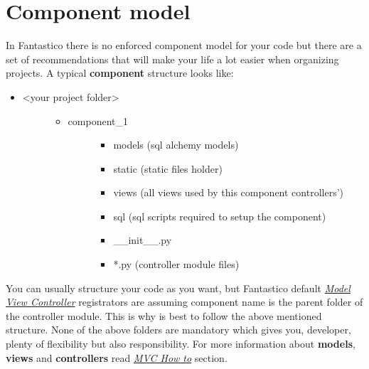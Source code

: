 \documentclass[letterpaper,10pt,english]{sphinxmanual}
\begin{document}
\section{Component model}
\label{features/component_model::doc}\label{features/component_model:component-model}
In Fantastico there is no enforced component model for your code but there are a set of recommendations
that will make your life a lot easier when organizing projects. A typical \textbf{component} structure looks like:
\begin{itemize}
\item {} \begin{description}
\item[{\textless{}your project folder\textgreater{}}] \leavevmode\begin{itemize}
\item {} \begin{description}
\item[{component\_1}] \leavevmode\begin{itemize}
\item {} 
models (sql alchemy models)

\item {} 
static (static files holder)

\item {} 
views (all views used by this component controllers')

\item {} 
sql (sql scripts required to setup the component)

\item {} 
\_\_init\_\_.py

\item {} 
*.py (controller module files)

\end{itemize}

\end{description}

\end{itemize}

\end{description}

\end{itemize}

You can usually structure your code as you want, but Fantastico default {\hyperref[features/mvc::doc]{\emph{Model View Controller}}} registrators are assuming
component name is the parent folder of the controller module. This is why is best to follow the above mentioned structure.
None of the above folders are mandatory which gives you, developer, plenty of flexibility but also responsibility. For
more information about \textbf{models}, \textbf{views} and \textbf{controllers} read {\hyperref[how_to/mvc_how_to::doc]{\emph{MVC How to}}} section.
\end{document}
